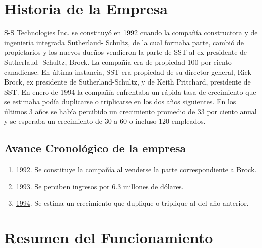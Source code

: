 \section{Historia de la Empresa}
	S-S Technologies Inc. se constituy\'{o} en 1992 cuando la  compa\~{n}\'{i}a constructora y de ingenier\'{i}a integrada Sutherlaud- Schultz, de la cual formaba parte, cambi\'{o} de propietarios y los nuevos due\~{n}os vendieron la parte de SST al ex presidente de Sutherlaud- Schultz, Brock. La compa\~{n}\'{i}a era de  propiedad 100 por ciento canadiense. En \'{u}ltima instancia, SST era propiedad de su director general, Rick Brock, ex presidente de Sutherland-Schultz, y de Keith Pritchard, presidente de SST. 
	En enero de 1994 la compa\~{n}\'{i}a enfrentaba un r\'{a}pida tasa de crecimiento que se estimaba pod\'{i}a duplicarse o triplicarse en los dos a\~{n}os siguientes. En los \'{u}ltimos 3 a\~{n}os se hab\'{i}a percibido un crecimiento promedio de 33 por ciento anual y se esperaba un crecimiento de 30 a 60 o incluso 120 empleados.

	\subsection{Avance Cronol\'{o}gico de la empresa}
	\begin{enumerate}
		\item \underline{1992}. Se constituye la compa\~{n}\'{i}a al venderse la parte correspondiente a Brock. 
		\item \underline{1993}. Se perciben ingresos por 6.3 millones de d\'{o}lares.
		\item \underline{1994}. Se estima un crecimiento que duplique o triplique al del a\~{n}o anterior.
	\end{enumerate}

\section{Resumen del Funcionamiento}

